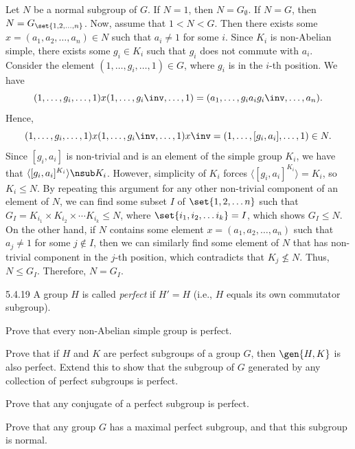 \begin{sol}
    Let $N$ be a normal subgroup of $G$.
	If $N = 1$, then $N = G_\emptyset$.
	If $N = G$, then $N = G_{\set{1, 2, \ldots, n}}$.
	Now, assume that $1 < N < G$.
	Then there exists some $x = (a_1, a_2, \ldots, a_n) \in N$ such that $a_i \neq 1$ for some $i$.
	Since $K_i$ is non-Abelian simple, there exists some $g_i \in K_i$ such that $g_i$ does not commute with $a_i$.
	Consider the element $(1, \ldots, g_i, \ldots, 1) \in G$, where $g_i$ is in the $i$-th position.
	We have
    \[
    	(1, \ldots, g_i, \ldots, 1) x (1, \ldots, g_i\inv, \ldots, 1) = (a_1, \ldots, g_i a_i g_i\inv, \ldots, a_n).
    \]
    Hence,
    \[
    	(1, \ldots, g_i, \ldots, 1) x (1, \ldots, g_i\inv, \ldots, 1) x\inv = (1, \ldots, [g_i, a_i], \ldots, 1) \in N.
    \]
    Since $[g_i, a_i]$ is non-trivial and is an element of the simple group $K_i$, we have that $\langle [g_i, a_i]^{K_i} \rangle \nsub K_i$.
	However, simplicity of $K_i$ forces $\langle [g_i, a_i]^{K_i} \rangle = K_i$, so $K_i \leq N$.
	By repeating this argument for any other non-trivial component of an element of $N$, we can find some subset $I$ of $\set{1, 2, \ldots n}$ such that $G_I = K_{i_1} \times K_{i_2} \times \cdots K_{i_k} \leq N$, where $\set{i_1, i_2, \ldots i_k} = I$, which shows $G_I \leq N$.
	On the other hand, if $N$ contains some element $x = (a_1, a_2, \ldots, a_n)$ such that $a_j \neq 1$ for some $j \notin I$, then we can similarly find some element of $N$ that has non-trivial component in the $j$-th position, which contradicts that $K_j \not\leq N$.
	Thus, $N \leq G_I$.
	Therefore, $N = G_I$.
\end{sol}

\begin{exercise}{5.4.19}
    A group $H$ is called \emph{perfect} if $H' = H$ (i.e., $H$ equals its own commutator subgroup).
    \begin{subexercises}
        \item Prove that every non-Abelian simple group is perfect.
        \item Prove that if $H$ and $K$ are perfect subgroups of a group $G$, then $\gen{H, K}$ is also perfect.
	Extend this to show that the subgroup of $G$ generated by any collection of perfect subgroups is perfect.
        \item Prove that any conjugate of a perfect subgroup is perfect.
        \item Prove that any group $G$ has a maximal perfect subgroup, and that this subgroup is normal.
    \end{subexercises}
\end{exercise}

